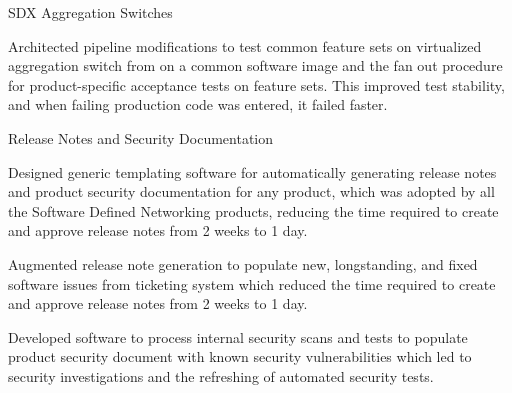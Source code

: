 \begin{cventries}
  \cventry
    {
} {SDX Aggregation Switches} {} {} {
      \begin{cvitems}
        \item {Architected pipeline modifications to test common feature sets on virtualized aggregation switch from on a common software image and the fan out procedure for product-specific acceptance tests on feature sets. This improved test stability, and when failing production code was entered, it failed faster.}
      \end{cvitems}
    }

  \cventry
    {
} {Release Notes and Security Documentation} {} {} {
      \begin{cvitems}
        \item {Designed generic templating software for automatically generating release notes and product security documentation for any product, which was adopted by all the Software Defined Networking products, reducing the time required to create and approve release notes from 2 weeks to 1 day.}
        \item {Augmented release note generation to populate new, longstanding, and fixed software issues from ticketing system which reduced the time required to create and approve release notes from 2 weeks to 1 day.}
        \item {Developed software to process internal security scans and tests to populate product security document with known security vulnerabilities which led to security investigations and the refreshing of automated security tests.}
      \end{cvitems}
    }


\end{cventries}
